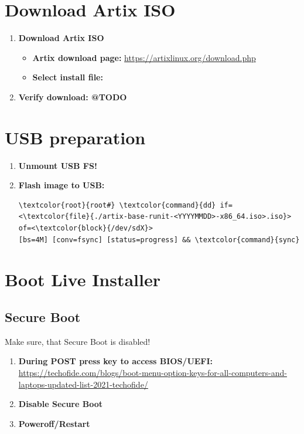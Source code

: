 \documentclass[10pt, a4paper, onecolumn, oneside, titlepage, openany]{book}
\begin{document}
\section{Download Artix ISO}
\begin{enumerate}
    \item \textbf{Download Artix ISO}
    \begin{itemize}
        \item \textbf{Artix download page:}
\newline \url{https://artixlinux.org/download.php}
        \item \textbf{Select install file:}
\newline {}
    \end{itemize}
    \item \textbf{Verify download: @TODO}
\end{enumerate}

\section{USB preparation}
\begin{enumerate}
    \item \textbf{Unmount USB FS!}
    \item \textbf{Flash image to USB:}
\begin{Verbatim}[commandchars=\\\{\}]
\textcolor{root}{root#} \textcolor{command}{dd} if=<\textcolor{file}{./artix-base-runit-<YYYYMMDD>-x86_64.iso>.iso}> of=<\textcolor{block}{/dev/sdX}>
[bs=4M] [conv=fsync] [status=progress] && \textcolor{command}{sync}
\end{Verbatim}
\end{enumerate}

\section{Boot Live Installer}
\subsection{Secure Boot}
Make sure, that Secure Boot is disabled!
\begin{enumerate}
    \item \textbf{During POST press key to access BIOS/UEFI:}
\newline \href{https://techofide.com/blogs/boot-menu-option-keys-for-all-computers-and-laptops-updated-list-2021-techofide/}{https://techofide.com/blogs/boot-menu-option-keys-for-all-computers-and-laptops-updated-list-2021-techofide/}
    \item \textbf{Disable Secure Boot}
    \item \textbf{Poweroff/Restart}
\end{enumerate}
\end{document}
